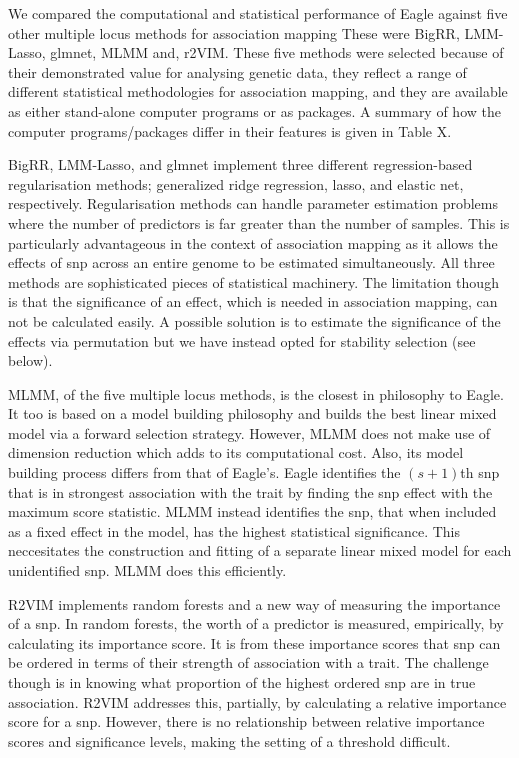 \documentclass{nature}
\begin{document}
We compared the computational and statistical performance of Eagle against five other multiple locus methods for 
association mapping  These were BigRR, LMM-Lasso, glmnet, MLMM  and, r2VIM. 
These five methods were selected because of their demonstrated value 
for analysing genetic data, they reflect a range of different statistical methodologies for association mapping, and they are available as 
either stand-alone computer programs or as  packages. A summary of how the computer programs/packages differ in their 
features is given in Table X. 

BigRR, LMM-Lasso, and glmnet  implement three different regression-based regularisation methods; generalized ridge regression, 
lasso, and elastic net, respectively. 
Regularisation methods can handle parameter estimation problems where the number of predictors is far greater than the number of 
samples. This is particularly advantageous in the context of association mapping as it allows the effects of snp across an entire 
genome to be estimated simultaneously. 
All three methods are sophisticated pieces of statistical machinery. The limitation though is that the significance of an effect, which 
is needed in association mapping,  can not be calculated easily. 
 A possible solution is to estimate the significance of the effects via permutation  \cite{shen2013novel}  
but we have instead opted for stability selection (see below).

MLMM, of the five multiple locus methods, is the closest in philosophy to Eagle. It too is based on a model building philosophy 
and builds the best linear mixed model via a forward selection strategy. However, MLMM does not make use of dimension 
reduction which adds to its computational cost. Also, its model building process differs from that of Eagle's. Eagle 
identifies the $(s+1)$th snp that is in strongest association with the trait by finding the snp effect with the maximum score statistic. 
MLMM instead identifies the snp, that when included as a fixed effect in the model, has the highest statistical 
significance. This neccesitates the construction and fitting of a separate linear mixed model for each unidentified snp. MLMM does this efficiently.

R2VIM implements random forests and a new way of measuring the importance of a snp.  In random forests, the worth of a predictor is measured, empirically, by calculating its importance score. It is from these importance scores that snp can be ordered in terms of their strength of association with a trait. The challenge though is in knowing what proportion of the 
highest ordered snp are in true association. R2VIM addresses this, partially, by calculating a relative importance score for a snp. However, 
there is no relationship between relative importance scores and significance levels, making the setting of a threshold difficult. 
\end{document}
